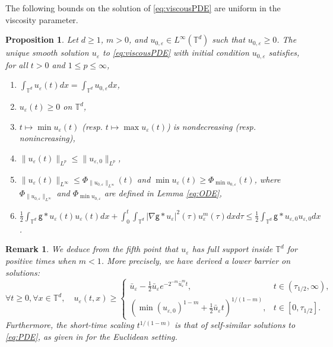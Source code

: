 \documentclass[11pt]{article}
\newtheorem{prop}[thm]{Proposition}
\newtheorem{remark}[thm]{Remark}
\numberwithin{equation}{section} %
\newcommand{\T}{{\mathbb{T}}}
\newcommand{\g}{{\mathsf{g}}}
\newcommand{\eps}{\varepsilon}
\newcommand{\ep}{\varepsilon}
\def \hal{\frac{1}{2}}
\def \ep{\varepsilon}
\def\nab{\nabla}
\begin{document}
The following bounds on the solution of \eqref{eq:viscousPDE} are uniform in the viscosity parameter.
\begin{prop}\label{prop:instantbounds}
    Let $d\ge 1$, $m>0$, and $u_{0,\ep} \in L^\infty(\T^d)$ such that $u_{0,\ep} \ge 0$. The unique smooth solution $u_\ep$ to \eqref{eq:viscousPDE} with initial condition $u_{0,\ep}$ satisfies, for all $t>0$ and $1\le p\le \infty$,
    \begin{enumerate}[label=\roman*.]
        \item  $\displaystyle \int_{\T^d} u_\ep(t) dx = \int_{\T^d} u_{0,\ep}dx$, 
        \item  $u_\ep(t)\ge 0$ on $\T^d$,
        \item  $t\mapsto \min u_\ep(t)$ (resp. $t\mapsto\max u_\ep(t)$) is nondecreasing (resp. nonincreasing),
        \item  $\|u_\ep(t)\|_{L^p} \le \|u_{\ep,0}\|_{L^p}$,
        \item  $\|u_\ep(t)\|_{L^\infty} \le \Phi_{\|u_{0,\ep}\|_{L^\infty}}(t)$ and $\min u_\ep(t) \ge \Phi_{\min u_{0,\ep}}(t)$, where $\Phi_{\|u_{0,\ep}\|_{L^\infty}}$ and $\Phi_{\min u_{0,\ep}}$ are defined in Lemma \ref{eq:ODE},
        \item $\displaystyle \hal \int_{\T^d} \g\ast u_\ep(t) u_\ep(t) dx  + \int_0^t\int_{\T^d} |\nab\g\ast u_\ep|^2(\tau) u_\ep^m(\tau)dxd\tau \le \hal\int_{\T^d} \g\ast u_{\ep,0} u_{\ep,0} dx$.
    \end{enumerate}
\end{prop}
\begin{remark}\label{remark:support}
    We deduce from the fifth point that $u_\ep$ has full support inside $\T^d$ for positive times when $m<1$. More precisely, we have derived a lower barrier on solutions:
    \begin{equation*}
        \forall t\ge 0, \forall x\in\T^d, \quad u_\ep(t,x) \ge \begin{cases}
            \displaystyle \bar u_\ep - \hal\bar u_\ep e^{-2^{-m}\bar  u_\ep^m t}, & t\in (\tau_{1/2},\infty),\\
            \displaystyle \left(\min (u_{\eps,0})^{1-m } + \hal\bar u_\ep t\right)^{1/(1-m)} ,& t\in [0,\tau_{1/2}].
        \end{cases}
    \end{equation*}
    Furthermore, the short-time scaling $t^{1/(1-m)}$ is that of self-similar solutions to \eqref{eq:PDE}, as given in \cite{CGV22FastRegularisation} for the Euclidean setting.
\end{remark}
\end{document}
